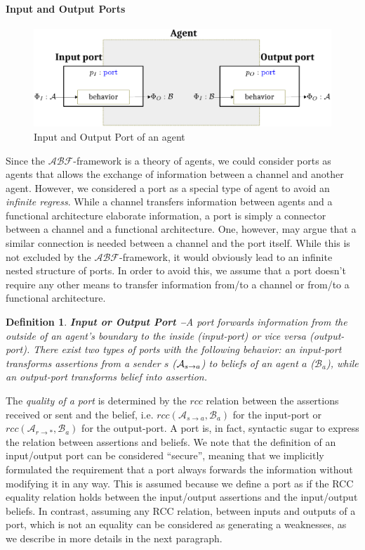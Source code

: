 \documentclass[conference]{IEEEtran}
\newcommand{\assertionRegion}{\mathcal{A}}
\newcommand{\beliefRegion}{\mathcal{B}}
\newcommand{\factRegion}{\mathcal{F}}
\newcommand{\rcc}{rcc}
\newcommand{\abftheory}{\assertionRegion\beliefRegion\factRegion}
\newcommand{\Rcc}[2]{rcc(#1,#2)}
\newcommand{\rassert}[3]{\mathcal{A}_{#1\rightarrow #2}#3}
\newtheorem{definition}{Definition}%
\begin{document}
\paragraph{Input and Output Ports}
\begin{figure}[t]
	\centering
	\includegraphics[width=\columnwidth]{IOports.pdf}
	\caption{Input and Output Port of an agent}
	\label{fig:ioports}
\end{figure}
Since the $\abftheory$-framework is a theory of agents, we could consider ports as
agents that allows the exchange of information between a channel and another
agent.  However, we considered a port as a special type of agent to avoid
an \emph{infinite regress}. While a channel transfers information between agents and
a functional architecture elaborate information, a port is simply a connector between
a channel and a functional architecture. One, however, may argue that a similar
connection is needed between a channel and the port itself. While this is not 
excluded by the $\abftheory$-framework, it would obviously lead to an infinite
nested structure of ports. In order to avoid this, we assume
that a port doesn't require any other means to transfer information from/to a channel
or from/to a functional architecture. 

\begin{definition}{\bf Input or Output Port --}\label{def:port} 
	A port forwards information from the outside of an agent's boundary to
	the inside (input-port) or vice versa (output-port).  There exist two
	types of ports with the following behavior: an input-port 
	transforms assertions from a sender $s$ ($\rassert{s}{a}$) to beliefs
	of an agent $a$ ($\beliefRegion_a$), while an output-port transforms belief
	into assertion.
\end{definition}
The \emph{quality of a port} is determined by the $\rcc$ relation between the
assertions received or sent and the belief, i.e.
$\Rcc{\rassert{s}{a}}{\beliefRegion_a}$ for the input-port or
$\Rcc{\rassert{r}{*}}{\beliefRegion_a}$ for the output-port.  A port is, in
fact, syntactic sugar to express the relation between assertions and beliefs.
We note that the definition of an input/output port can
be considered ``secure'', meaning that we implicitly formulated the requirement
that a port always forwards the information without modifying it in any way.
This is assumed because we define a port as if the RCC equality relation holds
between the input/output assertions and the input/output beliefs.  In contrast,
assuming any RCC relation, between inputs and outputs of a port, which is not
an equality can be considered as generating a weaknesses, as we describe in
more details in the next paragraph.
\end{document}
